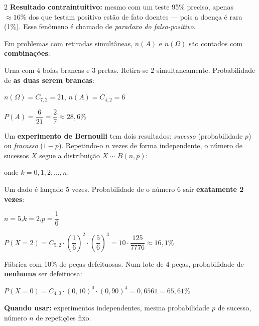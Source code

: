 \documentclass[12pt]{article}
\begin{document}
\begin{multicols}{2}
\vspace{4px}
\textbf{Resultado contraintuitivo:} mesmo com um teste 95\% preciso, apenas $\approx 16\%$ dos que testam positivo estão de fato doentes — pois a doença é rara (1\%). Esse fenômeno é chamado de \textit{paradoxo do falso-positivo}.


Em problemas com retiradas simultâneas, $n(A)$ e $n(\Omega)$ são contados com \textbf{combinações}:



Urna com 4 bolas brancas e 3 pretas. Retira-se 2 simultaneamente. Probabilidade de \textbf{as duas serem brancas}:

$n(\Omega) = C_{7,2} = 21$, \quad $n(A) = C_{4,2} = 6$
\vspace{5px}

$P(A) = \dfrac{6}{21} = \dfrac{2}{7} \approx 28{,}6\%$


Um \textbf{experimento de Bernoulli} tem dois resultados: \textit{sucesso} (probabilidade $p$) ou \textit{fracasso} ($1-p$). Repetindo-o $n$ vezes de forma independente, o número de sucessos $X$ segue a distribuição $X \sim B(n, p)$:


onde $k = 0, 1, 2, \ldots, n$.


Um dado é lançado 5 vezes. Probabilidade de o número 6 sair \textbf{exatamente 2 vezes}:

$n=5$,\quad $k=2$,\quad $p=\dfrac{1}{6}$
\vspace{5px}

$P(X=2) = C_{5,2} \cdot \left(\dfrac{1}{6}\right)^2 \cdot \left(\dfrac{5}{6}\right)^3 = 10 \cdot \dfrac{125}{7776} \approx 16{,}1\%$


Fábrica com 10\% de peças defeituosas. Num lote de 4 peças, probabilidade de \textbf{nenhuma} ser defeituosa:

$P(X=0) = C_{4,0} \cdot (0{,}10)^0 \cdot (0{,}90)^4 = 0{,}6561 = 65{,}61\%$

\vspace{4px}
\textbf{Quando usar:} experimentos independentes, mesma probabilidade $p$ de sucesso, número $n$ de repetições fixo.


\end{multicols}
\end{document}

